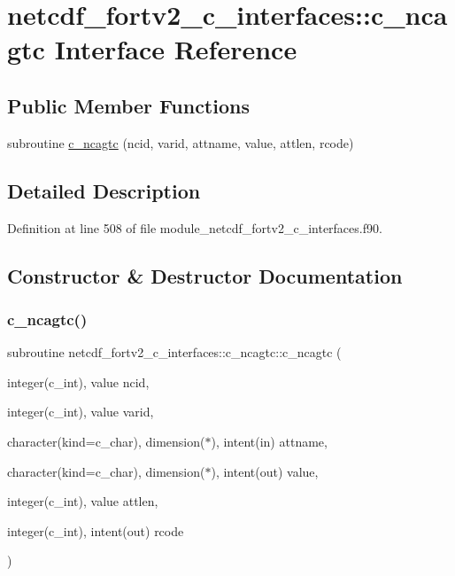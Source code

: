 \hypertarget{interfacenetcdf__fortv2__c__interfaces_1_1c__ncagtc}{}\section{netcdf\+\_\+fortv2\+\_\+c\+\_\+interfaces\+:\+:c\+\_\+ncagtc Interface Reference}
\label{interfacenetcdf__fortv2__c__interfaces_1_1c__ncagtc}
\subsection*{Public Member Functions}
\begin{DoxyCompactItemize}
\item 
subroutine \hyperlink{interfacenetcdf__fortv2__c__interfaces_1_1c__ncagtc_a12a2db18daab05fd1acf275d83cbf76d}{c\+\_\+ncagtc} (ncid, varid, attname, value, attlen, rcode)
\end{DoxyCompactItemize}


\subsection{Detailed Description}


Definition at line 508 of file module\+\_\+netcdf\+\_\+fortv2\+\_\+c\+\_\+interfaces.\+f90.



\subsection{Constructor \& Destructor Documentation}
\mbox{\label{interfacenetcdf__fortv2__c__interfaces_1_1c__ncagtc_a12a2db18daab05fd1acf275d83cbf76d}} 
\subsubsection{\texorpdfstring{c\+\_\+ncagtc()}{c\_ncagtc()}}
{\footnotesize\ttfamily subroutine netcdf\+\_\+fortv2\+\_\+c\+\_\+interfaces\+::c\+\_\+ncagtc\+::c\+\_\+ncagtc (\begin{DoxyParamCaption}\item[{integer(c\+\_\+int), value}]{ncid,  }\item[{integer(c\+\_\+int), value}]{varid,  }\item[{character(kind=c\+\_\+char), dimension($\ast$), intent(in)}]{attname,  }\item[{character(kind=c\+\_\+char), dimension($\ast$), intent(out)}]{value,  }\item[{integer(c\+\_\+int), value}]{attlen,  }\item[{integer(c\+\_\+int), intent(out)}]{rcode }\end{DoxyParamCaption})}



